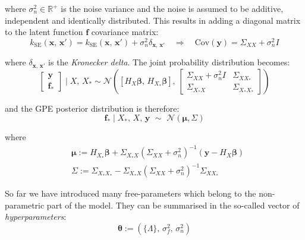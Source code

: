 \noindent
where $\sigma_n^2\in\mathbb{R}^{+}$ is the noise variance and the noise is assumed to be additive, independent and identically distributed. This results in adding a diagonal matrix to the latent function $\mathbf{f}$ covariance matrix:
\begin{equation}
    k_{\text{SE}}(\mathbf{x},\,\mathbf{x}') = k_{\text{SE}}(\mathbf{x},\,\mathbf{x}') + \sigma_n^2\delta_{\mathbf{x},\,\mathbf{x}'} \quad\Rightarrow\quad \text{Cov}(\mathbf{y})=\Sigma_{XX}+\sigma_n^2 I
\end{equation}

\noindent
where $\delta_{\mathbf{x},\,\mathbf{x}'}$ is the \textit{Kronecker delta}. The joint probability distribution becomes:
\begin{equation}
    \begin{bmatrix}
    \mathbf{y} \\ \mathbf{f}_{*}
    \end{bmatrix}\;\vert\; X,\,X_{*} \sim \mathcal{N}\left([H_{X}\boldsymbol{\beta},\,H_{X_{*}}\boldsymbol{\beta}],\,\begin{bmatrix}
    \Sigma_{XX}+\sigma_n^2 I & \Sigma_{XX_{*}} \\
    \Sigma_{X_{*}X} & \Sigma_{X_{*}X_{*}}
    \end{bmatrix}
    \right)
\end{equation}

\noindent
and the GPE posterior distribution is therefore:
\begin{equation}\label{eq:gpepostdistr}
    \mathbf{f}_{*}\;\vert\; X_{*},\,X,\,\mathbf{y}\,\,\sim\,\,\mathcal{N}(\boldsymbol{\mu},\Sigma)
\end{equation}
    
\noindent
where
%
\begin{align}
    &\boldsymbol{\mu} := H_{X_{*}}\boldsymbol{\beta} + \Sigma_{X_{*}X}(\Sigma_{XX}+\sigma_n^2)^{-1}(\mathbf{y} - H_{X}\boldsymbol{\beta}) \\
    &\Sigma := \Sigma_{X_{*}X_{*}}-\Sigma_{X_{*}X}(\Sigma_{XX}+\sigma_n^2)^{-1}\Sigma_{XX_{*}}
\end{align}

So far we have introduced many free-parameters which belong to the non-parametric part of the model. They can be summarised in the so-called vector of \textit{hyperparameters}:
\begin{equation}
    \boldsymbol{\theta}:=(\{\Lambda\},\,\sigma_f^2,\,\sigma_n^2)    
\end{equation}

